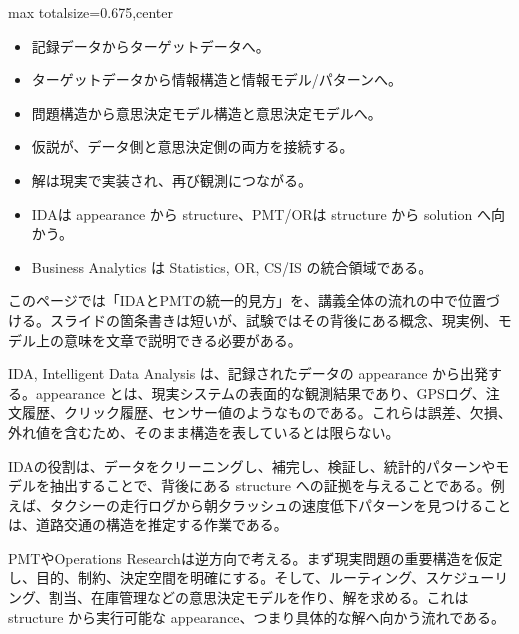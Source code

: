 \clearpage
{}
\begin{adjustbox}{max totalsize={\textwidth}{0.675\textheight},center}
\begin{minipage}{\textwidth}\scriptsize
\begin{minipage}[t]{0.485\textwidth}
\begin{itemize}
\item 記録データからターゲットデータへ。
\item ターゲットデータから情報構造と情報モデル/パターンへ。
\item 問題構造から意思決定モデル構造と意思決定モデルへ。
\item 仮説が、データ側と意思決定側の両方を接続する。
\item 解は現実で実装され、再び観測につながる。
\end{itemize}
\begin{itemize}
\item IDAは appearance から structure、PMT/ORは structure から solution へ向かう。
\item Business Analytics は Statistics, OR, CS/IS の統合領域である。
\end{itemize}
\end{minipage}\hfill
\begin{minipage}[t]{0.485\textwidth}
このページでは「IDAとPMTの統一的見方」を、講義全体の流れの中で位置づける。スライドの箇条書きは短いが、試験ではその背後にある概念、現実例、モデル上の意味を文章で説明できる必要がある。\par
IDA, Intelligent Data Analysis は、記録されたデータの appearance から出発する。appearance とは、現実システムの表面的な観測結果であり、GPSログ、注文履歴、クリック履歴、センサー値のようなものである。これらは誤差、欠損、外れ値を含むため、そのまま構造を表しているとは限らない。\par
IDAの役割は、データをクリーニングし、補完し、検証し、統計的パターンやモデルを抽出することで、背後にある structure への証拠を与えることである。例えば、タクシーの走行ログから朝夕ラッシュの速度低下パターンを見つけることは、道路交通の構造を推定する作業である。\par
PMTやOperations Researchは逆方向で考える。まず現実問題の重要構造を仮定し、目的、制約、決定空間を明確にする。そして、ルーティング、スケジューリング、割当、在庫管理などの意思決定モデルを作り、解を求める。これは structure から実行可能な appearance、つまり具体的な解へ向かう流れである。\par

\end{minipage}
\end{minipage}
\end{adjustbox}
